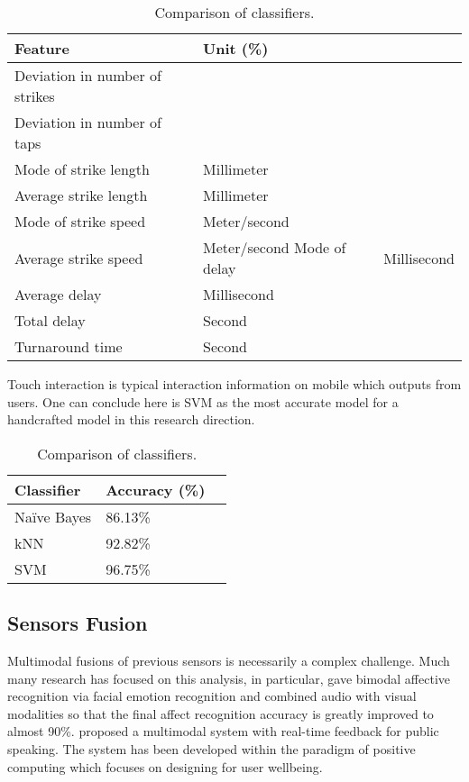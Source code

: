 \begin{table}
  \caption{Comparison of classifiers.}
  \label{tab:touch-feature}
  \scriptsize
  \begin{center}
    \begin{tabular}{lll}
      Feature & Unit (\%)\\
    \hline
    Deviation in number of strikes & \\
    Deviation in number of taps & \\
    Mode of strike length & Millimeter \\
    Average strike length & Millimeter \\ 
    Mode of strike speed  & Meter/second \\ 
    Average strike speed  & Meter/second
    Mode of delay & Millisecond \\
    Average delay & Millisecond \\ 
    Total delay   & Second\\
    Turnaround time & Second\\
    \end{tabular}
  \end{center}
\end{table}

Touch interaction is typical interaction information on mobile which outputs from users.
One can conclude here is SVM as the most accurate model for a handcrafted model in this research direction.

\begin{table}
  \caption{Comparison of classifiers.}
  \label{tab:touch-cls}
  \scriptsize
  \begin{center}
    \begin{tabular}{lll}
      Classifier & Accuracy (\%) \\
    \hline
    Naïve Bayes     & 86.13\%           \\
    kNN                & 92.82\%       \\
    SVM                 & 96.75\%         \\
    \end{tabular}
  \end{center}
\end{table}

\subsection{Sensors Fusion}\label{subsec:fusion}

Multimodal fusions of previous sensors is necessarily a complex challenge. Much many research has focused on this analysis, in particular, \cite{Zeng2004} gave bimodal affective recognition via facial emotion recognition and combined audio with visual modalities so that the final affect recognition accuracy is greatly improved to almost 90\%. \cite{Dermody2016} proposed a multimodal system with real-time feedback for public speaking. The system has been developed within the paradigm of positive computing which focuses on designing for user wellbeing.

